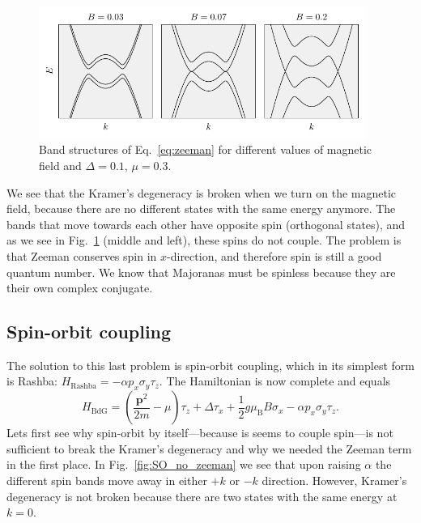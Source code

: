 \begin{figure}
\begin{centering}
\includegraphics[width=0.95\textwidth]{chapter_introduction/figures/zeeman.pdf}
\par\end{centering}
\caption{Band structures of Eq.~\ref{eq:zeeman} for different values of magnetic field and $\Delta=0.1$, $\mu=0.3$.
\label{fig:zeeman}}
\end{figure}
We see that the Kramer's degeneracy is broken when we turn on the magnetic field, because there are no different states with the same energy anymore.
The bands that move towards each other have opposite spin (orthogonal states), and as we see in Fig.~\ref{fig:zeeman} (middle and left), these spins do not couple.
The problem is that Zeeman conserves spin in $x$-direction, and therefore spin is still a good quantum number.
We know that Majoranas must be spinless because they are their own complex conjugate.


\subsection{Spin-orbit coupling}

The solution to this last problem is spin-orbit coupling, which in its simplest form is Rashba: $H_{\textrm{Rashba}}=-\alpha p_{x}\sigma_{y}\tau_{z}$.
The Hamiltonian is now complete and equals
\begin{equation}
H_{\textrm{BdG}}=\left(\frac{\bm{p}^{2}}{2m}-\mu\right)\tau_{z}+\Delta\tau_{x}+\frac{1}{2}g\mu_{\textrm{B}}B\sigma_{x}-\alpha p_{x}\sigma_{y}\tau_{z}.\label{eq:rashba}
\end{equation}
Lets first see why spin-orbit by itself---because is seems to couple spin---is not sufficient to break the Kramer's degeneracy and why we needed the Zeeman term in the first place.
In Fig.~\ref{fig:SO_no_zeeman} we see that upon raising $\alpha$ the different spin bands move away in either $+k$ or $-k$ direction.
However, Kramer's degeneracy is not broken because there are two states with the same energy at $k=0$.

